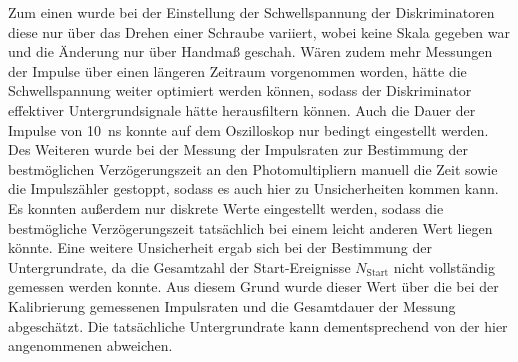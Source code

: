 Zum einen wurde bei der Einstellung der Schwellspannung der Diskriminatoren diese nur über das Drehen einer Schraube variiert,
wobei keine Skala gegeben war und die Änderung nur über Handmaß geschah.
%
Wären zudem mehr Messungen der Impulse über einen längeren Zeitraum vorgenommen worden,
hätte die Schwellspannung weiter optimiert werden können,
sodass der Diskriminator effektiver Untergrundsignale hätte herausfiltern können.
%
Auch die Dauer der Impulse von \SI{10}{\nano\second} konnte auf dem Oszilloskop nur bedingt eingestellt werden.
%
Des Weiteren wurde bei der Messung der Impulsraten zur Bestimmung der bestmöglichen Verzögerungszeit an den Photomultipliern
manuell die Zeit sowie die Impulszähler gestoppt,
sodass es auch hier zu Unsicherheiten kommen kann.
%
Es konnten außerdem nur diskrete Werte eingestellt werden,
sodass die bestmögliche Verzögerungszeit tatsächlich bei einem leicht anderen Wert liegen könnte.
%
Eine weitere Unsicherheit ergab sich bei der Bestimmung der Untergrundrate,
da die Gesamtzahl der Start-Ereignisse $N_\text{Start}$ nicht vollständig gemessen werden konnte.
Aus diesem Grund wurde dieser Wert über die bei der Kalibrierung gemessenen Impulsraten und die Gesamtdauer der Messung abgeschätzt.
Die tatsächliche Untergrundrate kann dementsprechend von der hier angenommenen abweichen.
